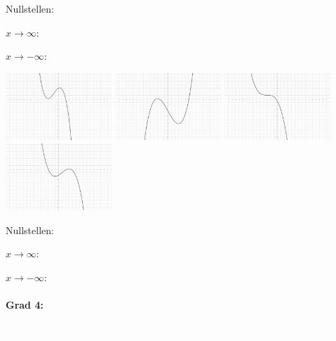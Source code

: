 \documentclass[12pt, parskip=half, a4paper, oneside]{scrartcl}
\begin{document}
\begin{addmargin}[-2cm]{0pt}
Nullstellen:

$x\rightarrow\infty:$

$x\rightarrow-\infty:$
\end{addmargin}

\includegraphics[width=4cm]{Bilder/G35}\hfill
\includegraphics[width=4cm]{Bilder/G36}\hfill
\includegraphics[width=4cm]{Bilder/G37}\hfill
\includegraphics[width=4cm]{Bilder/G38}

\begin{addmargin}[-2cm]{0pt}
Nullstellen:

$x\rightarrow\infty:$

$x\rightarrow-\infty:$
\end{addmargin}

\newpage

\paragraph{Grad 4:}\textcolor{white}{.}
\end{document}
